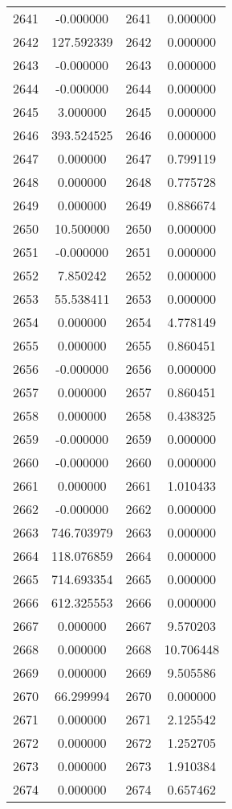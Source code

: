 \documentclass[12pt]{article}
\begin{document}
\begin{longtable}{@{}cccc@{}}
2641 & -0.000000 & 2641 & 0.000000 \\
2642 & 127.592339 & 2642 & 0.000000 \\
2643 & -0.000000 & 2643 & 0.000000 \\
2644 & -0.000000 & 2644 & 0.000000 \\
2645 & 3.000000 & 2645 & 0.000000 \\
2646 & 393.524525 & 2646 & 0.000000 \\
2647 & 0.000000 & 2647 & 0.799119 \\
2648 & 0.000000 & 2648 & 0.775728 \\
2649 & 0.000000 & 2649 & 0.886674 \\
2650 & 10.500000 & 2650 & 0.000000 \\
2651 & -0.000000 & 2651 & 0.000000 \\
2652 & 7.850242 & 2652 & 0.000000 \\
2653 & 55.538411 & 2653 & 0.000000 \\
2654 & 0.000000 & 2654 & 4.778149 \\
2655 & 0.000000 & 2655 & 0.860451 \\
2656 & -0.000000 & 2656 & 0.000000 \\
2657 & 0.000000 & 2657 & 0.860451 \\
2658 & 0.000000 & 2658 & 0.438325 \\
2659 & -0.000000 & 2659 & 0.000000 \\
2660 & -0.000000 & 2660 & 0.000000 \\
2661 & 0.000000 & 2661 & 1.010433 \\
2662 & -0.000000 & 2662 & 0.000000 \\
2663 & 746.703979 & 2663 & 0.000000 \\
2664 & 118.076859 & 2664 & 0.000000 \\
2665 & 714.693354 & 2665 & 0.000000 \\
2666 & 612.325553 & 2666 & 0.000000 \\
2667 & 0.000000 & 2667 & 9.570203 \\
2668 & 0.000000 & 2668 & 10.706448 \\
2669 & 0.000000 & 2669 & 9.505586 \\
2670 & 66.299994 & 2670 & 0.000000 \\
2671 & 0.000000 & 2671 & 2.125542 \\
2672 & 0.000000 & 2672 & 1.252705 \\
2673 & 0.000000 & 2673 & 1.910384 \\
2674 & 0.000000 & 2674 & 0.657462 \\

\end{longtable}
\end{document}
